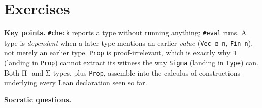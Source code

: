 \section{Exercises}\label{sec:01-basics:06-exercises:1}

\textbf{Key points.} \texttt{\#check} reports a type without running anything; \texttt{\#eval} runs. A type is \emph{dependent} when a later type mentions an earlier \emph{value} (\texttt{Vec α n}, \texttt{Fin n}), not merely an earlier type. \texttt{Prop} is proof-irrelevant, which is exactly why \texttt{∃} (landing in \texttt{Prop}) cannot extract its witness the way \texttt{Sigma} (landing in \texttt{Type}) can. Both Π- and Σ-types, plus \texttt{Prop}, assemble into the calculus of constructions underlying every Lean declaration seen so far.

\textbf{Socratic questions.}

